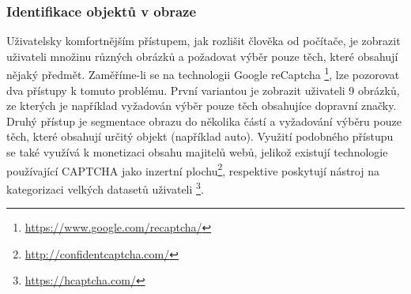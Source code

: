 \documentclass[
  field=ainfp,
  master=true,
  biblatex,
  sourcecodes=false,
  theorems=false,
  glossaries,
  index
]{kidiplom}
\begin{document}
\subsubsection*{Identifikace objektů v obraze}
Uživatelsky komfortnějším přístupem, jak rozlišit člověka od počítače, je zobrazit uživateli množinu různých obrázků a požadovat výběr pouze těch, které obsahují nějaký předmět. Zaměříme-li se na technologii Google reCaptcha \footnote{\url{https://www.google.com/recaptcha/}}, lze pozorovat dva přístupy k tomuto problému. První variantou je zobrazit uživateli 9 obrázků, ze kterých je například vyžadován výběr pouze těch obsahujíce dopravní značky. Druhý přístup je segmentace obrazu do několika částí a vyžadování výběru pouze těch, které obsahují určitý objekt (například auto). Využití podobného přístupu se také využívá k monetizaci obsahu majitelů webů, jelikož existují technologie používající CAPTCHA jako inzertní plochu\footnote{\url{http://confidentcaptcha.com/}}, respektive poskytují nástroj na kategorizaci velkých datasetů uživateli \footnote{\url{https://hcaptcha.com/}}. 
\end{document}
